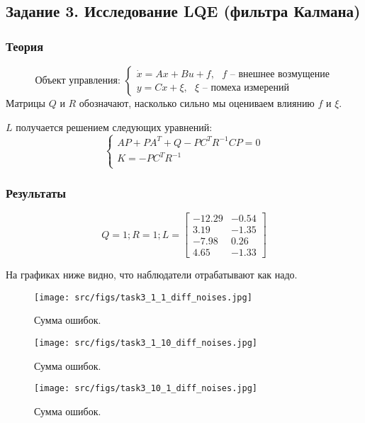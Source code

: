 \subsection{Задание 3. Исследование LQE (фильтра Калмана)}

\subsubsection{Теория}
\[      
        \text{Объект управления: }
        \begin{cases}
                \dot{x} = A x + Bu + f, \text{ \(f\) -- внешнее возмущение}\\
                y = Cx + \xi, \text{ \(\xi\) -- помеха измерений}
        \end{cases} 
\]
Матрицы \(Q\) и \(R\) обозначают, насколько сильно мы оцениваем влиянию \(f\) и \(\xi\).

\(L\) получается решением следующих уравнений:
\[
\begin{cases}
    A P + P A^T + Q - PC^TR^{-1}CP = 0\\
    K = -P C^T R^{-1}\\
\end{cases}
\]
\subsubsection{Результаты}
\[Q = 1; R = 1; L = \begin{bmatrix}
        -12.29 & -0.54\\
         3.19 & -1.35\\
        -7.98 &  0.26\\
         4.65 & -1.33
       \end{bmatrix}\]

На графиках ниже видно, что наблюдатели отрабатывают как надо.
\begin{figure}[ht!]
  \centering
  \texttt{[image: src/figs/task3\_1\_1\_diff\_noises.jpg]}
  \caption{Сумма ошибок.}
  \label{fig:task3_1}
\end{figure}
\begin{figure}[ht!]
        \centering
        \texttt{[image: src/figs/task3\_1\_10\_diff\_noises.jpg]}
        \caption{Сумма ошибок.}
        \label{fig:task3_2}
\end{figure}
\begin{figure}[ht!]
\centering
\texttt{[image: src/figs/task3\_10\_1\_diff\_noises.jpg]}
\caption{Сумма ошибок.}
\label{fig:task3_3}
\end{figure}


